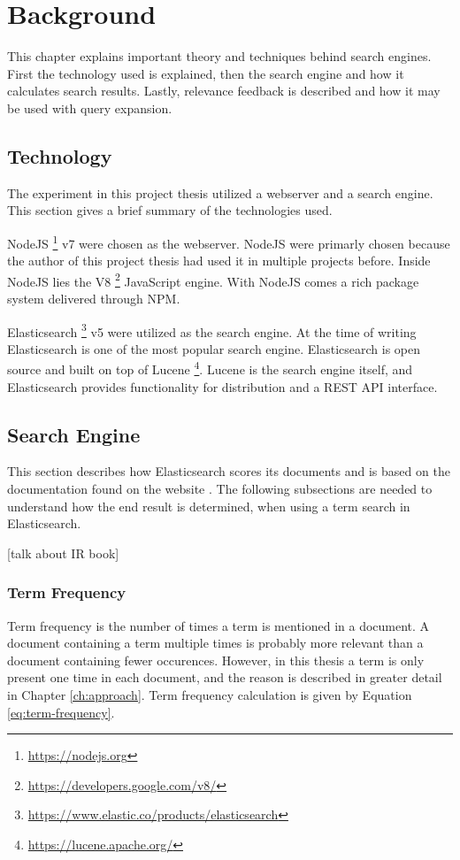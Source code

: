 \chapter{Background}
\label{ch:background}
This chapter explains important theory and techniques behind search engines.
First the technology used is explained, then the search engine and how it calculates search results.
Lastly, relevance feedback is described and how it may be used with query expansion.

\section{Technology}
The experiment in this project thesis utilized a webserver and a search engine.
This section gives a brief summary of the technologies used.

NodeJS \footnote{\url{https://nodejs.org}} v7 were chosen as the webserver.
NodeJS were primarly chosen because the author of this project thesis had used it in multiple projects before.
Inside NodeJS lies the V8 \footnote{\url{https://developers.google.com/v8/}} JavaScript engine.
With NodeJS comes a rich package system delivered through NPM.

Elasticsearch \footnote{\url{https://www.elastic.co/products/elasticsearch}} v5 were utilized as the search engine.
At the time of writing Elasticsearch is one of the most popular search engine.
Elasticsearch is open source and built on top of Lucene \footnote{\url{https://lucene.apache.org/}}.
Lucene is the search engine itself,
and Elasticsearch provides functionality for distribution and a REST API interface.

\section{Search Engine}
This section describes how Elasticsearch scores its documents and is based on the documentation found on the website \cite{elasticsearch-scoring}.
The following subsections are needed to understand how the end result is determined, when using a term search in Elasticsearch.

[talk about IR book] \cite{ir-book}

\subsection{Term Frequency}
Term frequency is the number of times a term is mentioned in a document.
A document containing a term multiple times is probably more relevant than a document containing fewer occurences.
However, in this thesis a term is only present one time in each document, and the reason is described in greater detail in Chapter \ref{ch:approach}.
Term frequency calculation is given by Equation \ref{eq:term-frequency}.

